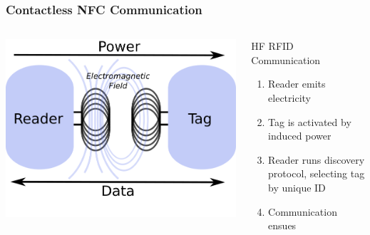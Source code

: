 \documentclass[unknownkeysallowed]{beamer}
\begin{document}
\begin{frame}
\frametitle{Contactless NFC Communication}
  \begin{center}\begin{minipage}{.9\textwidth}
  \vspace{4mm}
  \begin{columns}[T]
    \begin{column}{.5\textwidth}
      \begin{block}{}
        \begin{center}
          \includegraphics[width=0.4\paperwidth]{figures/emitterAndTag.png}
        \end{center}
      \end{block}
    \end{column}
    \begin{column}{.5\textwidth}
      \vspace{4mm}
     \begin{block}{HF RFID Communication}
		\begin{enumerate}
        \pause
		    \item{Reader emits electricity}
        \pause
		    \item{Tag is activated by induced power}
        \pause
      	\item{Reader runs discovery protocol, selecting tag by unique ID}
        \pause
      	\item{Communication ensues}
   		\end{enumerate}
    \end{block}
    \end{column}
  \end{columns}
  \end{minipage}\end{center}
\end{frame}
\end{document}
